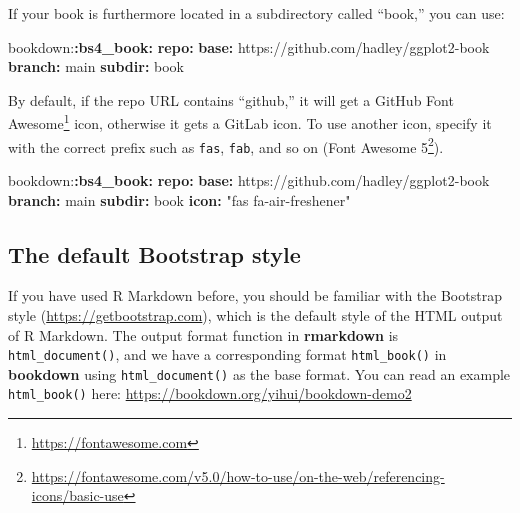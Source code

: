 \documentclass[
  12pt,
]{krantz}
\newenvironment{Shaded}{\begin{snugshade}}{\end{snugshade}}
\newcommand{\AttributeTok}[1]{\textcolor[rgb]{0.13,0.29,0.53}{#1}}
\newcommand{\FunctionTok}[1]{\textcolor[rgb]{0.13,0.29,0.53}{\textbf{#1}}}
\newcommand{\KeywordTok}[1]{\textcolor[rgb]{0.13,0.29,0.53}{\textbf{#1}}}
\newcommand{\StringTok}[1]{\textcolor[rgb]{0.31,0.60,0.02}{#1}}
\renewcommand{\href}[2]{#2\footnote{\url{#1}}}
\theoremstyle{definition}
\theoremstyle{definition}
\theoremstyle{definition}
\theoremstyle{definition}
\theoremstyle{remark}
\begin{document}
If your book is furthermore located in a subdirectory called ``book,'' you can use:

\begin{Shaded}
\begin{Highlighting}[]
\AttributeTok{bookdown:}\FunctionTok{:bs4\_book}\KeywordTok{:}
\AttributeTok{  }\FunctionTok{repo}\KeywordTok{:}
\AttributeTok{    }\FunctionTok{base}\KeywordTok{:}\AttributeTok{ https://github.com/hadley/ggplot2{-}book}
\AttributeTok{    }\FunctionTok{branch}\KeywordTok{:}\AttributeTok{ main}
\AttributeTok{    }\FunctionTok{subdir}\KeywordTok{:}\AttributeTok{ book}
\end{Highlighting}
\end{Shaded}

By default, if the repo URL contains ``github,'' it will get a GitHub \href{https://fontawesome.com}{Font Awesome} icon, otherwise it gets a GitLab icon.
To use another icon, specify it with the correct prefix such as \texttt{fas}, \texttt{fab}, and so on (\href{https://fontawesome.com/v5.0/how-to-use/on-the-web/referencing-icons/basic-use}{Font Awesome 5}).

\begin{Shaded}
\begin{Highlighting}[]
\AttributeTok{bookdown:}\FunctionTok{:bs4\_book}\KeywordTok{:}
\AttributeTok{  }\FunctionTok{repo}\KeywordTok{:}
\AttributeTok{    }\FunctionTok{base}\KeywordTok{:}\AttributeTok{ https://github.com/hadley/ggplot2{-}book}
\AttributeTok{    }\FunctionTok{branch}\KeywordTok{:}\AttributeTok{ main}
\AttributeTok{    }\FunctionTok{subdir}\KeywordTok{:}\AttributeTok{ book}
\AttributeTok{    }\FunctionTok{icon}\KeywordTok{:}\AttributeTok{ }\StringTok{"fas fa{-}air{-}freshener"}
\end{Highlighting}
\end{Shaded}

\subsection{The default Bootstrap style}\label{bootstrap-style}

If you have used R Markdown before, you should be familiar with the Bootstrap style (\url{https://getbootstrap.com}), which is the default style of the HTML output of R Markdown. The output format function in \textbf{rmarkdown} is \texttt{html\_document()}, and we have a corresponding format \texttt{html\_book()} in \textbf{bookdown} using \texttt{html\_document()} as the base format. You can read an example \texttt{html\_book()} here: \url{https://bookdown.org/yihui/bookdown-demo2}
\end{document}
